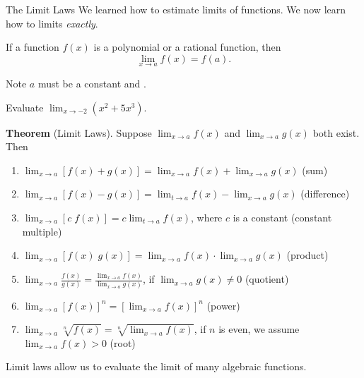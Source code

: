 \documentclass[../main.tex]{subfiles}
\begin{document}
\begin{lesson}{The Limit Laws}
  We learned how to estimate limits of functions. We now learn how to  limits \emph{exactly}.


  \begin{mdframed}[style=simple-compact]
    If a function \(f(x)\) is a polynomial or a rational function, then
    \[
      \lim_{x \to a} f(x) = f(a).
    \]
  \end{mdframed}
  \faExclamationTriangle{} Note \(a\) must be a constant \underline{\hspace{6cm}} and \underline{\hspace{2in}}.

  \begin{example}
    Evaluate \(\lim_{x \to -2} (x^{2} + 5 x^{3})\).

  \end{example}

  \begin{mdframed}[style=withref-compact]
    \textbf{Theorem} (Limit Laws). Suppose \(\lim_{x \to a} f(x)\) and \(\lim_{x \to a} g(x)\) {both exist}. Then
    \begin{enumerate}[label=(\arabic*)]
      \item \(\lim_{x \to a} [f(x) + g(x)] = \lim_{x \to a} f(x) + \lim_{x \to a} g(x)\) \hfill (sum)
      \item \(\lim_{x \to a} [f(x) - g(x)] = \lim_{t \to a} f(x) - \lim_{x \to a} g(x)\) \hfill (difference)
      \item \(\lim_{x \to a} [c \; f(x)] = c \lim_{t \to a} f(x)\), where \(c\) is a constant \hfill (constant multiple)
      \item \(\lim_{x \to a} [f(x) \; g(x)] = \lim_{x \to a} f(x) \cdot \lim_{x \to a} g(x)\) \hfill (product)
      \item \(\lim_{x \to a} \frac{f(x)}{g(x)} = \frac{\lim_{x \to a} f(x)}{\lim_{x \to a} g(x)}\), \quad if {\(\lim_{x \to a}g(x) \ne 0\)} \hfill (quotient)
      \item \(\lim_{x \to a} [f(x)]^{n} = \left[ \lim_{x \to a} f(x) \right]^{n}\) \hfill (power)
      \item \(\lim_{x \to a} \sqrt[n]{f(x)} = \sqrt[n]{\lim_{x \to a} f(x)}\), \quad if \(n\) is even, we assume {\(\lim_{x \to a} f(x) > 0\)} \hfill (root)
    \end{enumerate}
  \end{mdframed}
  \faLightbulb{} Limit laws allow us to evaluate the limit of many algebraic functions. 


\end{lesson}
\end{document}
